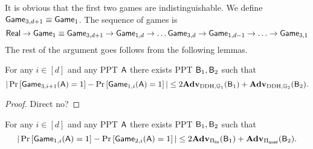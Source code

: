 
It is obvious that the first two games are indistinguishable. We define $\mathsf{Game}_{3,d+1}\equiv\mathsf{Game}_1$. The sequence of games is
$$
\mathsf{Real}  \to \mathsf{Game}_1 \equiv \mathsf{Game}_{3,d+1} \to \mathsf{Game}_{1,d} \to \ldots \mathsf{Game}_{3,d}\to \mathsf{Game}_{1,d-1}\to
\ldots \to \mathsf{Game}_{3,1}
$$
The rest of the argument goes follows from the following lemmas.

\begin{lemma} \label{lemma:3-1}
For any $i\in[d]$ and any PPT $\mathsf{A}$ there exists PPT $\mathsf{B}_1,\mathsf{B}_2$ such that 
$$|\Pr\left[ \mathsf{Game}_{3,i+1}(\mathsf{A})=1\right]-\Pr\left[ \mathsf{Game}_{1,i}(\mathsf{A})=1\right]|\leq 2\mathbf{Adv}_{\mathrm{DDH},\mathbb{G}_1}(\mathsf{B}_1)+\mathbf{Adv}_{\mathrm{DDH},\mathbb{G}_2}(\mathsf{B}_2).$$
\end{lemma}

\begin{proof}  Direct no?
\end{proof}

\begin{lemma} \label{lemma:1-2}
For any $i\in[d]$ and any PPT $\mathsf{A}$ there exists PPT $\mathsf{B}_1,\mathsf{B}_2$ such that 
$$|\Pr\left[ \mathsf{Game}_{1,i}(\mathsf{A})=1\right]-\Pr\left[ \mathsf{Game}_{2,i}(\mathsf{A})=1\right]|\leq 2\mathbf{Adv}_{\Pi_\mathsf{lin}}(\mathsf{B}_1)+\mathbf{Adv}_{\Pi_\mathsf{quad}}(\mathsf{B}_2).$$
\end{lemma}

